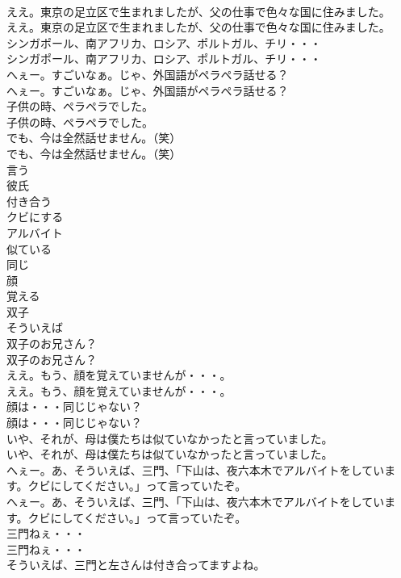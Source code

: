 \documentclass[8pt]{extreport}
\begin{document}
\begin{CJK}{UTF8}{min}
\\	ええ。東京の足立区で生まれましたが、父の仕事で色々な国に住みました。	
\\	ええ。東京の足立区で生まれましたが、父の仕事で色々な国に住みました。 
\\	シンガポール、南アフリカ、ロシア、ポルトガル、チリ・・・	
\\	シンガポール、南アフリカ、ロシア、ポルトガル、チリ・・・ 
\\	へぇー。すごいなぁ。じゃ、外国語がペラペラ話せる？	
\\	へぇー。すごいなぁ。じゃ、外国語がペラペラ話せる？ 
\\	子供の時、ペラペラでした。	
\\	子供の時、ペラペラでした。 
\\	でも、今は全然話せません。（笑）	
\\	でも、今は全然話せません。（笑） 
\\	言う
\\	彼氏
\\	付き合う
\\	クビにする
\\	アルバイト
\\	似ている
\\	同じ
\\	顔
\\	覚える
\\	双子
\\	そういえば
\\	双子のお兄さん？	
\\	双子のお兄さん？ 
\\	ええ。もう、顔を覚えていませんが・・・。	
\\	ええ。もう、顔を覚えていませんが・・・。 
\\	顔は・・・同じじゃない？	
\\	顔は・・・同じじゃない？ 
\\	いや、それが、母は僕たちは似ていなかったと言っていました。	
\\	いや、それが、母は僕たちは似ていなかったと言っていました。 
\\	へぇー。あ、そういえば、三門、「下山は、夜六本木でアルバイトをしています。クビにしてください。」って言っていたぞ。	
\\	へぇー。あ、そういえば、三門、「下山は、夜六本木でアルバイトをしています。クビにしてください。」って言っていたぞ。 
\\	三門ねぇ・・・	
\\	三門ねぇ・・・ 
\\	そういえば、三門と左さんは付き合ってますよね。	

\end{CJK}
\end{document}
